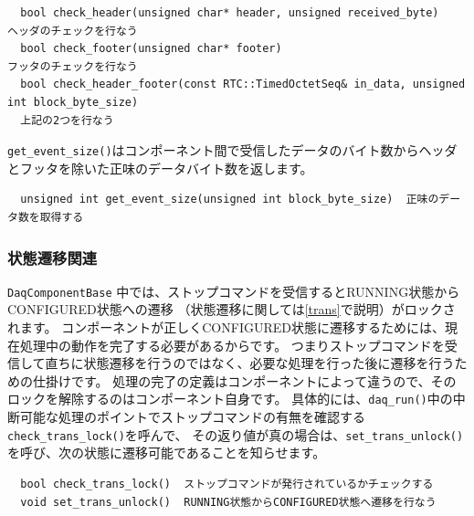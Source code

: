 \documentclass[a4j,10pt,dvips,onecolumn,oneside,final]{jarticle}%
\begin{document}
\begin{Verbatim}
  bool check_header(unsigned char* header, unsigned received_byte)     ヘッダのチェックを行なう
  bool check_footer(unsigned char* footer)                             フッタのチェックを行なう
  bool check_header_footer(const RTC::TimedOctetSeq& in_data, unsigned int block_byte_size) 
  上記の2つを行なう
\end{Verbatim}

\verb|get_event_size()|はコンポーネント間で受信したデータのバイト数からヘッダとフッタを除いた正味のデータバイト数を返します。
\begin{Verbatim}
  unsigned int get_event_size(unsigned int block_byte_size)  正味のデータ数を取得する
\end{Verbatim}

\subsubsection{状態遷移関連}\label{state}
\verb|DaqComponentBase| 中では、ストップコマンドを受信するとRUNNING状態からCONFIGURED状態への遷移
（状態遷移に関しては\ref{trans}で説明）がロックされます。
コンポーネントが正しくCONFIGURED状態に遷移するためには、現在処理中の動作を完了する必要があるからです。
つまりストップコマンドを受信して直ちに状態遷移を行うのではなく、必要な処理を行った後に遷移を行うための仕掛けです。
処理の完了の定義はコンポーネントによって違うので、そのロックを解除するのはコンポーネント自身です。
具体的には、\verb|daq_run()|中の中断可能な処理のポイントでストップコマンドの有無を確認する\verb|check_trans_lock()|を呼んで、
その返り値が真の場合は、\verb|set_trans_unlock()|を呼び、次の状態に遷移可能であることを知らせます。

\begin{Verbatim}
  bool check_trans_lock()  ストップコマンドが発行されているかチェックする
  void set_trans_unlock()  RUNNING状態からCONFIGURED状態へ遷移を行なう
\end{Verbatim}
\end{document}
